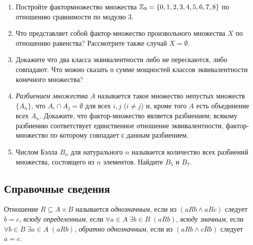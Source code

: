 \begin{enumerate}
\item Постройте фактормножество множества $\mathbb Z_9=\{0,1,2,3,4,5,6,7,8\}$ по отношению сравнимости по модулю $3$.

\item Что представляет собой фактор-множество произвольного множества $X$ по отношению равенства? Рассмотрите также случай $X=\emptyset$.

\item Докажите что два класса эквивалентности либо не перескаются, либо совпадают. Что можно сказать о сумме мощностей классов эквивалентности конечного множества?

\item \textit{Разбиением множества} $A$ называется такое множество непустых множеств $\{A_n\}$, что $A_i\cap A_j=\emptyset$ для всех $i,j$ ($i\ne j$) и, кроме того $A$ есть объединение всех $A_n$. Докажите, что
\ipunkt фактор-множество является разбиением; \ipunkt всякому разбиению соответствует единственное отношение эквивалентности, фактор-множество по которому совпадает с данным разбиением.

\item Числом Бэлла $B_n$ для натурального $n$ называется количество всех разбиений множества, состоящего из $n$ элементов. Найдите $B_5$ и $B_7$.


\end{enumerate}

\subsection*{Справочные сведения}

Отношение $R\subseteq A\times B$ называется \ipunkt \textit{однозначным}, если из $(aRb\land aRc)$ следует $b=c$,
\ipunkt \textit{всюду определенным}, если $\forall a\in A\;\exists b\in B\; (aRb)$, \ipunkt \textit{всюду значным}, если $\forall b\in B\;\exists a\in A\;(aRb)$, \textit{обратно однозначным}, если из $(aRb\land cRb)$ следует $a=c$.

